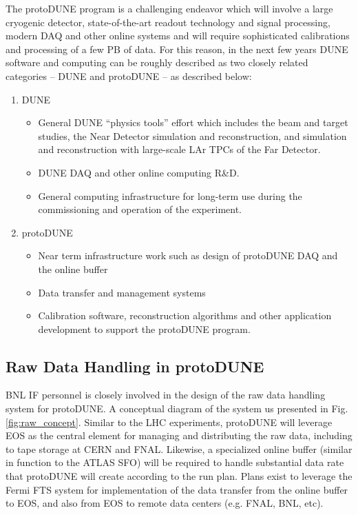 \documentclass[pdftex,12pt,letter]{article}
\begin{document}
The protoDUNE program is a challenging endeavor which will involve a large cryogenic detector,
state-of-the-art readout technology and signal processing, modern DAQ and other online systems and will require sophisticated calibrations
and processing of a few PB of data. For this reason, in the next few years DUNE software and computing
can be roughly described as two closely related
categories -- DUNE and protoDUNE -- as described below:
\begin{enumerate}

\item DUNE
\begin{itemize}
\item General DUNE ``physics tools'' effort which includes the beam and target studies, the Near Detector
simulation and reconstruction, and simulation and reconstruction with large-scale LAr TPCs of the Far Detector.

\item DUNE DAQ and other online computing R\&D.

\item General computing infrastructure for long-term use during the commissioning and operation of the experiment.
\end{itemize}

\item protoDUNE
\begin{itemize}
\item Near term infrastructure work such as design of protoDUNE DAQ and the online buffer
\item Data transfer and management systems
\item Calibration software, reconstruction algorithms and other application development to support the protoDUNE program.
\end{itemize}
\end{enumerate}

\subsection{Raw Data Handling in protoDUNE}
BNL IF personnel is closely involved in the design of the raw data handling system for protoDUNE.
A conceptual diagram of the system us presented in Fig.\,\ref{fig:raw_concept}. Similar to the
LHC experiments, protoDUNE will leverage EOS as the central element for managing and distributing
the raw data, including to tape storage at CERN and FNAL. Likewise, a specialized online buffer (similar
in function to the ATLAS SFO) will be required to handle substantial data rate that protoDUNE will create
according to the run plan. Plans exist to leverage the Fermi FTS system for implementation of the data
transfer from the online buffer to EOS, and also from EOS to remote data centers (e.g. FNAL, BNL, etc).
\end{document}

